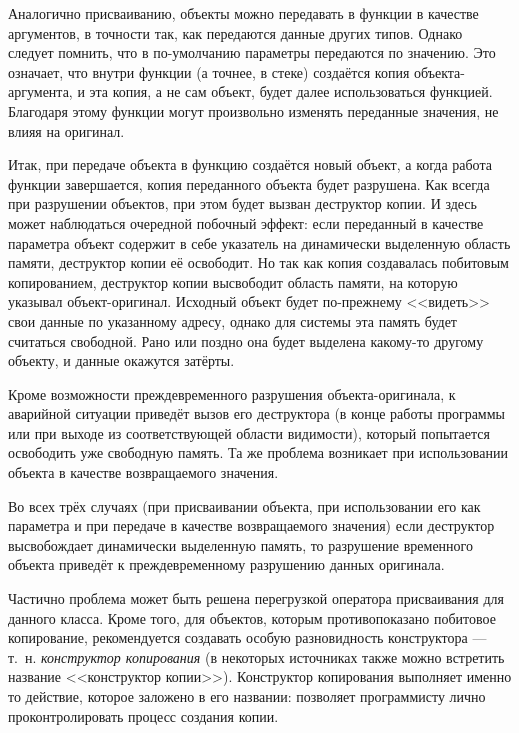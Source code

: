 Аналогично присваиванию, объекты можно передавать в функции в качестве аргументов, в точности так, как передаются данные
других типов. Однако следует помнить, что в  по-умолчанию параметры передаются по значению. Это означает, что внутри
функции (а точнее, в стеке) создаётся копия объекта-аргумента, и эта копия, а не сам объект, будет далее использоваться
функцией. Благодаря этому функции могут произвольно изменять переданные значения, не влияя на оригинал. 

Итак, при передаче объекта в функцию создаётся новый объект, а когда работа функции завершается, копия переданного
объекта будет разрушена. Как всегда при разрушении объектов, при этом будет вызван деструктор копии. И здесь может
наблюдаться очередной побочный эффект: если переданный в качестве параметра объект содержит в себе указатель на
динамически выделенную область памяти, деструктор копии её освободит. Но так как копия создавалась побитовым
копированием, деструктор копии высвободит область памяти, на которую указывал объект-оригинал. Исходный объект будет
по-прежнему <<видеть>> свои данные по указанному адресу, однако для системы эта память будет считаться свободной. Рано
или поздно она будет выделена какому-то другому объекту, и данные окажутся затёрты. 

Кроме возможности преждевременного разрушения объекта-оригинала, к аварийной ситуации приведёт вызов его деструктора (в
конце работы программы или при выходе из соответствующей области видимости), который попытается освободить уже
свободную память. Та же проблема возникает при использовании объекта в качестве возвращаемого значения.

Во всех трёх случаях (при присваивании объекта, при использовании его как параметра и при передаче в качестве
возвращаемого значения) если деструктор высвобождает динамически выделенную память, то разрушение временного объекта
приведёт к преждевременному разрушению данных оригинала.

Частично проблема может быть решена перегрузкой оператора присваивания для  данного класса. Кроме того, для объектов,
которым противопоказано побитовое копирование, рекомендуется создавать особую разновидность конструктора --- т.~н. 
\emph{конструктор копирования} (в
некоторых источниках также можно встретить название <<конструктор копии>>). Конструктор копирования выполняет именно то
действие, которое заложено в его названии: позволяет программисту лично проконтролировать процесс создания копии.

